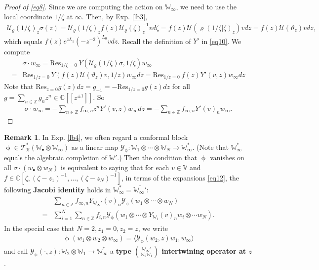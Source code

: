 \documentclass[11pt,b5paper,notitlepage]{article}
\theoremstyle{definition}
\newtheorem{rem}[df]{Remark}
\theoremstyle{plain}
\newcommand{\fk}{\mathfrak}
\newcommand{\mc}{\mathcal}
\newcommand{\ovl}{\overline}
\newcommand{\Res}{\mathrm{Res}}
\newcommand{\bk}[1]{\langle {#1}\rangle}
\newcommand{\scr}{\mathscr}
\newcommand{\blt}{\bullet}
\newcommand{\Vbb}{\mathbb V}
\newcommand{\Wbb}{\mathbb W}
\newcommand{\Cbb}{\mathbb C}
\newcommand{\Zbb}{\mathbb Z}
\numberwithin{equation}{section}
\begin{document}
\begin{proof}[Proof of \eqref{eq8}]
Since we are computing the action on $\Wbb_\infty$, we need to use the local coordinate $1/\zeta$ at $\infty$. Then, by Exp. \ref{lb3},
\begin{align*}
\mc U_\varrho(1/\zeta)_z\sigma(z)=\mc U_\varrho(1/\zeta)_z f(z)\mc U_\varrho(\zeta)^{-1}_zvd\zeta=f(z)\mc U(\varrho(1/\zeta|\zeta)_z)vdz=f(z)\mc U(\vartheta_z)vdz,
\end{align*}
which equals $f(z)e^{zL_1}(-z^{-2})^{L_0}vdz$. Recall the definition of $Y'$ in \eqref{eq10}. We compute
\begin{align*}
&\sigma\cdot w_\infty=\Res_{1/\zeta=0}~Y(\mc U_\varrho(1/\zeta)\sigma,1/\zeta)w_\infty \\
=&\Res_{1/z=0}~Y(f(z)\mc U(\vartheta_z)v,1/z)w_\infty dz=\Res_{1/z=0}~f(z)Y'(v,z)w_\infty dz
\end{align*}
Note that $\Res_{z=0}g(z)dz=g_{-1}=-\Res_{1/z=0}g(z)dz$ for all $g=\sum_{n\in\Zbb}g_nz^n\in\Cbb[[z^{\pm1}]]$. So
\begin{align*}
\sigma\cdot w_\infty=-\sum_{n\in\Zbb}f_{\infty,n}z^nY'(v,z)w_\infty dz=-\sum_{n\in\Zbb} f_{\infty,n}Y'(v)_n w_\infty.
\end{align*}
\end{proof}

\begin{rem}\label{lb14}
In Exp. \ref{lb4}, we often regard a conformal block $\upphi\in\scr T_{\fk X}^*(\Wbb_\blt\otimes\Wbb_\infty)$ as a linear map $\mc Y_\upphi:\Wbb_1\otimes\cdots\otimes\Wbb_N\rightarrow\Wbb_\infty^*$. (Note that $\Wbb_\infty^*$ equals the algebraic completion of $\Wbb'$.) Then the condition that $\upphi$ vanishes on all $\sigma\cdot(w_\blt\otimes w_N)$ is equivalent to saying that for each $v\in\Vbb$ and $f\in \Cbb[\zeta,(\zeta-z_1)^{-1},\dots,(\zeta-z_N)^{-1}]$, in terms of the expansions \eqref{eq12}, the following \textbf{Jacobi identity} holds in $\Wbb_\infty^*=\ovl{\Wbb_\infty'}$:
\begin{align}\label{eq17}
\begin{aligned}
&\sum_{n\in\Zbb}f_{\infty,n}Y_{\Wbb_\infty'}(v)_n\mc Y_{\upphi}(w_1\otimes\cdots\otimes w_N)\\
=&\sum_{i=1}^N\sum_{n\in\Zbb} f_{i,n} \mc Y_\upphi(w_1\otimes\cdots\otimes Y_{\Wbb_i}(v)_n w_i\otimes\cdots w_N).
\end{aligned}
\end{align}
In the special case that $N=2,z_1=0,z_2=z$, we write
\begin{align*}
\upphi(w_1\otimes w_2\otimes w_\infty)=\bk{\mc Y_\upphi(w_2,z)w_1,w_\infty}
\end{align*}
and call $\mc Y_\upphi(\cdot,z):\Wbb_2\otimes\Wbb_1\rightarrow\Wbb_\infty^*$ a \textbf{type $\Wbb_\infty'\choose \Wbb_2\Wbb_1$ intertwining operator  at $z$}.
\end{rem}
\end{document}
